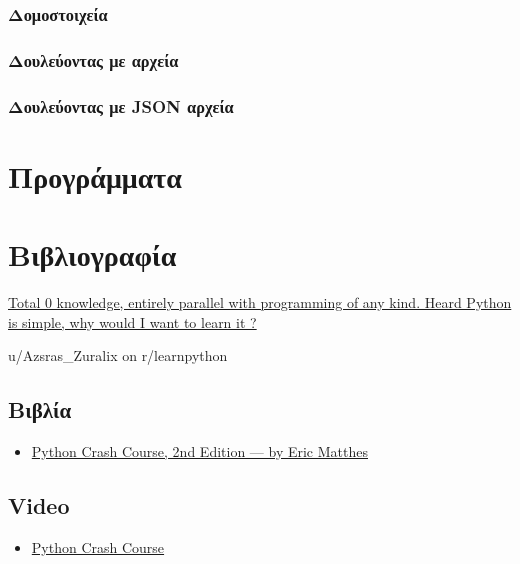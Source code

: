 \documentclass[a4paper,14pt]{extreport}
\begin{document}
\subsection{Δομοστοιχεία}
\subsection{Δουλεύοντας με αρχεία}
\subsection{Δουλεύοντας με JSON αρχεία}

\chapter{Προγράμματα}

\chapter{Βιβλιογραφία}
\epigraph{\href{https://tinyurl.com/ycnad9ch}
    {Total 0 knowledge, entirely parallel with programming of any kind.
        Heard Python is simple, why would I want to learn it ?
    }
}{u/Azsras\_Zuralix on r/learnpython}
\section{Βιβλία}
\begin{itemize}
    \item \href{https://tinyurl.com/y7l2a48c}{Python Crash Course, 2nd
              Edition — by Eric Matthes}
\end{itemize}
\section{Video}
\begin{itemize}
    \item \href{https://tinyurl.com/ya8wk4xm}{Python Crash Course}
\end{itemize}
\end{document}
